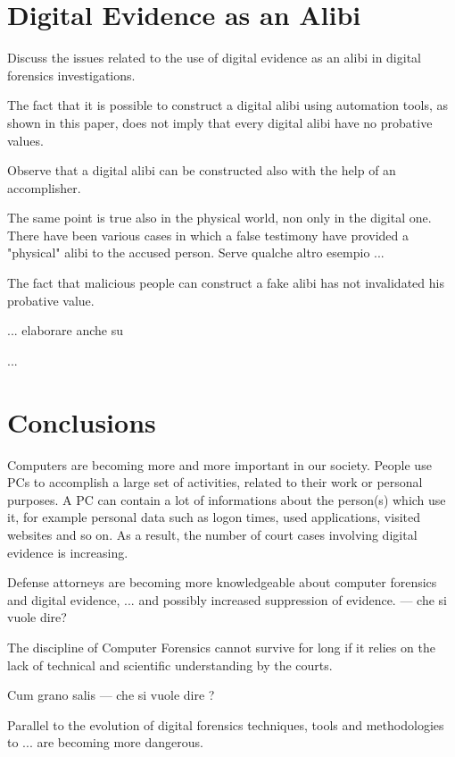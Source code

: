 \documentclass[runningheads,english]{llncs}
\begin{document}
{\section{Digital Evidence as an Alibi}
\label{sec:DEasAlibi}

Discuss the issues related to the use of digital evidence as an alibi in digital
forensics investigations.

The fact that it is possible to construct a digital alibi using automation
tools, as shown in this paper, does not imply that every digital alibi have no probative
values. 

Observe that a digital alibi can be constructed also with the help of an
accomplisher.

The same point is true also in the physical world, non only in the digital one.
There have been various cases in which a false testimony have provided a
"physical" alibi to the accused person. Serve qualche altro esempio ...

The fact that malicious people can construct a fake alibi has not invalidated
his probative value.

... elaborare anche su
~\cite{Caloyannides} 
~\cite{Carrier}

...

\section{Conclusions}
\label{sec:conc}

Computers are becoming more and more important in our society. People use PCs to accomplish a large set of activities, related to their work or personal purposes. A PC can contain a lot of informations about the person(s) which use it, for example personal data such as logon times, used applications, visited websites and so on. As a result, the number of court cases involving digital evidence is increasing.

Defense attorneys are becoming more knowledgeable about computer forensics and digital evidence, ... and possibly increased suppression of evidence. --- che si vuole dire?

The discipline of Computer Forensics cannot survive for long if it relies on the
lack of technical and scientific understanding by the courts.

Cum grano salis --- che si vuole dire ?

Parallel to the evolution of digital forensics techniques, tools and methodologies to ... are becoming more dangerous.

}
\end{document}
